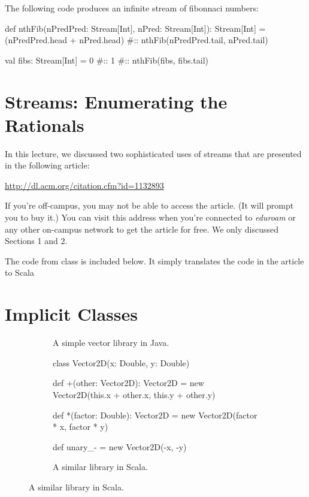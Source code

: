 \documentclass[9pt]{extbook}
\begin{document}
The following code produces an infinite stream of fibonnaci numbers:

\begin{scalacode}
def nthFib(nPredPred: Stream[Int], nPred: Stream[Int]): Stream[Int] = {
  (nPredPred.head + nPred.head) #:: nthFib(nPredPred.tail, nPred.tail)
}

val fibs: Stream[Int] = 0 #:: 1 #:: nthFib(fibs, fibs.tail)
\end{scalacode}

\chapter{Streams: Enumerating the Rationals}

In this lecture, we discussed two sophisticated uses of streams that are presented in the following
article:

\href{http://dl.acm.org/citation.cfm?id=1132893}{http://dl.acm.org/citation.cfm?id=1132893}

If you're off-campus, you may not be able to access the article. (It will prompt you to buy it.) You can visit this address
when you're connected to \emph{eduroam} or any other on-campus network to get the article for free. We only discussed Sections 1 and 2.

The code from class is included below. It simply translates the code in the article to Scala


\chapter{Implicit Classes}

\begin{figure}
\begin{subfigure}{.45\textwidth}
\caption{A simple vector library in Java.}
\label{vector2d}
\end{subfigure}
\quad\vrule\quad
\begin{subfigure}{.45\textwidth}
\begin{scalacode}
class Vector2D(x: Double, y: Double) {
  def +(other: Vector2D): Vector2D = {
    new Vector2D(this.x + other.x,
                 this.y + other.y)
  }

  def *(factor: Double): Vector2D = {
    new Vector2D(factor * x,
                 factor * y)
  }

  def unary_- = new Vector2D(-x, -y)
}
\end{scalacode}
\caption{A similar library in Scala.}
\label{vector2dscala}
\end{subfigure}
\end{figure}
\end{document}

